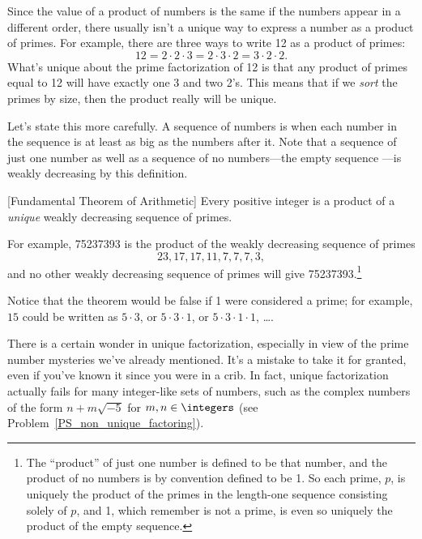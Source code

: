 Since the value of a product of numbers is the same if the numbers
appear in a different order, there usually isn't a unique way to
express a number as a product of primes.  For example, there are three
ways to write 12 as a product of primes:
\[
12 = 2 \cdot 2 \cdot 3 = 2 \cdot 3 \cdot 2 = 3 \cdot 2 \cdot 2.
\]
What's unique about the prime factorization of 12 is that any product
of primes equal to 12 will have exactly one 3 and two 2's.  This means
that if we \emph{sort} the primes by size, then the product really
will be unique.

Let's state this more carefully.  A sequence of numbers is
\emph{} when each number in the sequence is at
least as big as the numbers after it.  Note that a sequence of just
one number as well as a sequence of no numbers---the empty sequence
---is weakly decreasing by this definition.

\begin{theorem}\label{thm:unique_factor}[Fundamental Theorem of Arithmetic]
Every positive integer is a product of a \emph{unique} weakly
decreasing sequence of primes.
\end{theorem}

For example, 75237393 is the product of the weakly decreasing sequence
of primes
\[
23, 17, 17, 11, 7, 7, 7, 3,
\]
and no other weakly decreasing sequence of primes will give
75237393.\footnote{The ``product'' of just one number is defined to be
  that number, and the product of no numbers is by convention defined
  to be 1.  So each prime, $p$, is uniquely the product of the primes
  in the length-one sequence consisting solely of $p$, and 1, which
  remember is not a prime, is even so uniquely the product of the
  empty sequence.}

Notice that the theorem would be false if 1 were considered a prime;
for example, $15$ could be written as $5 \cdot 3$, or $5 \cdot 3 \cdot
1$, or $5 \cdot 3 \cdot 1 \cdot 1$, \dots.

There is a certain wonder in unique factorization, especially in view
of the prime number mysteries we've already mentioned.  It's a mistake
to take it for granted, even if you've known it since you were in a
crib.  In fact, unique factorization actually fails for many
integer-like sets of numbers, such as the complex numbers of the
form $n + m\sqrt{-5}$ for $m,n \in \integers$ (see
Problem~\ref{PS_non_unique_factoring}).

